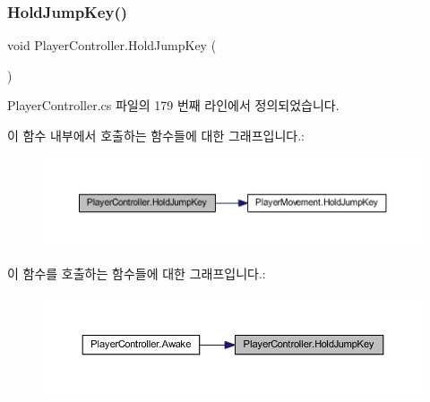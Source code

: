 \subsubsection{\texorpdfstring{HoldJumpKey()}{HoldJumpKey()}}
{\footnotesize\ttfamily void Player\+Controller.\+Hold\+Jump\+Key (\begin{DoxyParamCaption}{ }\end{DoxyParamCaption})}



Player\+Controller.\+cs 파일의 179 번째 라인에서 정의되었습니다.


\begin{DoxyCode}{0}

\end{DoxyCode}
이 함수 내부에서 호출하는 함수들에 대한 그래프입니다.\+:
\nopagebreak
\begin{figure}[H]
\begin{center}
\leavevmode
\includegraphics[width=350pt]{dc/dde/class_player_controller_ad5c697ec9c26fbd98bdd028e06ca3ae2_cgraph}
\end{center}
\end{figure}
이 함수를 호출하는 함수들에 대한 그래프입니다.\+:
\nopagebreak
\begin{figure}[H]
\begin{center}
\leavevmode
\includegraphics[width=350pt]{dc/dde/class_player_controller_ad5c697ec9c26fbd98bdd028e06ca3ae2_icgraph}
\end{center}
\end{figure}
\mbox{\label{class_player_controller_a1f27776786e67be2633f94b97c93ebdc}} 
